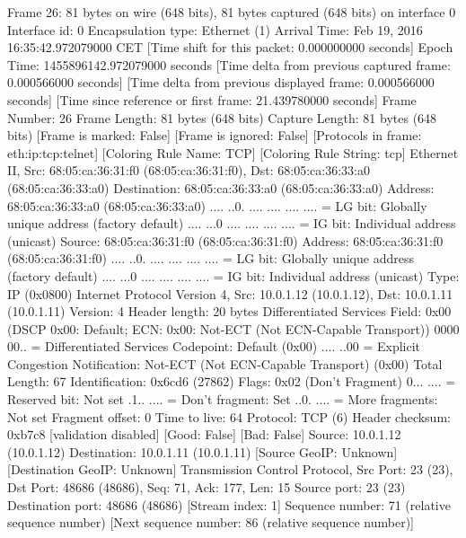 Frame 26: 81 bytes on wire (648 bits), 81 bytes captured (648 bits) on interface 0
    Interface id: 0
    Encapsulation type: Ethernet (1)
    Arrival Time: Feb 19, 2016 16:35:42.972079000 CET
    [Time shift for this packet: 0.000000000 seconds]
    Epoch Time: 1455896142.972079000 seconds
    [Time delta from previous captured frame: 0.000566000 seconds]
    [Time delta from previous displayed frame: 0.000566000 seconds]
    [Time since reference or first frame: 21.439780000 seconds]
    Frame Number: 26
    Frame Length: 81 bytes (648 bits)
    Capture Length: 81 bytes (648 bits)
    [Frame is marked: False]
    [Frame is ignored: False]
    [Protocols in frame: eth:ip:tcp:telnet]
    [Coloring Rule Name: TCP]
    [Coloring Rule String: tcp]
Ethernet II, Src: 68:05:ca:36:31:f0 (68:05:ca:36:31:f0), Dst: 68:05:ca:36:33:a0 (68:05:ca:36:33:a0)
    Destination: 68:05:ca:36:33:a0 (68:05:ca:36:33:a0)
        Address: 68:05:ca:36:33:a0 (68:05:ca:36:33:a0)
        .... ..0. .... .... .... .... = LG bit: Globally unique address (factory default)
        .... ...0 .... .... .... .... = IG bit: Individual address (unicast)
    Source: 68:05:ca:36:31:f0 (68:05:ca:36:31:f0)
        Address: 68:05:ca:36:31:f0 (68:05:ca:36:31:f0)
        .... ..0. .... .... .... .... = LG bit: Globally unique address (factory default)
        .... ...0 .... .... .... .... = IG bit: Individual address (unicast)
    Type: IP (0x0800)
Internet Protocol Version 4, Src: 10.0.1.12 (10.0.1.12), Dst: 10.0.1.11 (10.0.1.11)
    Version: 4
    Header length: 20 bytes
    Differentiated Services Field: 0x00 (DSCP 0x00: Default; ECN: 0x00: Not-ECT (Not ECN-Capable Transport))
        0000 00.. = Differentiated Services Codepoint: Default (0x00)
        .... ..00 = Explicit Congestion Notification: Not-ECT (Not ECN-Capable Transport) (0x00)
    Total Length: 67
    Identification: 0x6cd6 (27862)
    Flags: 0x02 (Don't Fragment)
        0... .... = Reserved bit: Not set
        .1.. .... = Don't fragment: Set
        ..0. .... = More fragments: Not set
    Fragment offset: 0
    Time to live: 64
    Protocol: TCP (6)
    Header checksum: 0xb7c8 [validation disabled]
        [Good: False]
        [Bad: False]
    Source: 10.0.1.12 (10.0.1.12)
    Destination: 10.0.1.11 (10.0.1.11)
    [Source GeoIP: Unknown]
    [Destination GeoIP: Unknown]
Transmission Control Protocol, Src Port: 23 (23), Dst Port: 48686 (48686), Seq: 71, Ack: 177, Len: 15
    Source port: 23 (23)
    Destination port: 48686 (48686)
    [Stream index: 1]
    Sequence number: 71    (relative sequence number)
    [Next sequence number: 86    (relative sequence number)]
